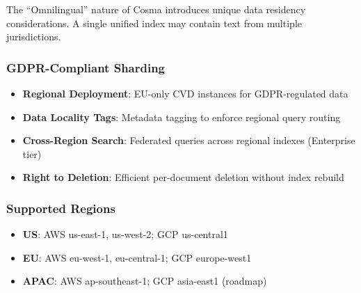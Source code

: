 The ``Omnilingual'' nature of Cosma introduces unique data residency considerations. A single unified index may contain text from multiple jurisdictions.

\subsubsection{GDPR-Compliant Sharding}


\begin{itemize}[noitemsep]
    \item \textbf{Regional Deployment}: EU-only CVD instances for GDPR-regulated data
    \item \textbf{Data Locality Tags}: Metadata tagging to enforce regional query routing
    \item \textbf{Cross-Region Search}: Federated queries across regional indexes (Enterprise tier)
    \item \textbf{Right to Deletion}: Efficient per-document deletion without index rebuild
\end{itemize}

\subsubsection{Supported Regions}

\begin{itemize}[noitemsep]
    \item \textbf{US}: AWS us-east-1, us-west-2; GCP us-central1
    \item \textbf{EU}: AWS eu-west-1, eu-central-1; GCP europe-west1
    \item \textbf{APAC}: AWS ap-southeast-1; GCP asia-east1 (roadmap)
\end{itemize}
